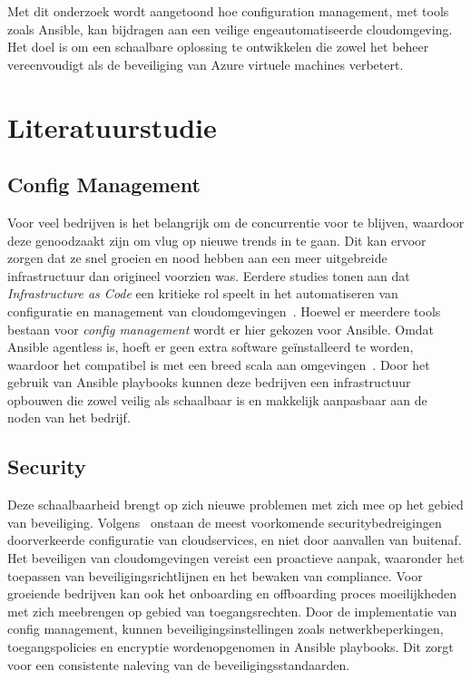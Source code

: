 Met dit onderzoek wordt aangetoond hoe configuration management, met tools zoals Ansible, kan bijdragen aan een veilige en\linebreak geautomatiseerde cloudomgeving.
Het doel is om een schaalbare oplossing te ontwikkelen die zowel het beheer vereenvoudigt als de beveiliging van Azure virtuele machines verbetert.


\section{Literatuurstudie}%
\label{sec:literatuurstudie}

\subsection{Config Management}%

Voor veel bedrijven is het belangrijk om de concurrentie voor te blijven, waardoor deze genoodzaakt zijn om vlug op nieuwe trends in te gaan.
Dit kan ervoor zorgen dat ze snel groeien en nood hebben aan een meer uitgebreide infrastructuur dan origineel voorzien was.
Eerdere studies tonen aan dat \emph{Infrastructure as Code} een kritieke rol speelt in het automatiseren van configuratie en management van cloudomgevingen\linebreak~\autocite{Kalliomaa2024}.
Hoewel er meerdere tools bestaan voor \emph{config management} wordt er hier gekozen voor Ansible.
Omdat Ansible agentless is, hoeft er geen extra software geïnstalleerd te worden, waardoor het compatibel is met een breed scala aan omgevingen~\autocite{Elradi2023}.
Door het gebruik van Ansible playbooks kunnen deze bedrijven een infrastructuur opbouwen die zowel veilig als schaalbaar is en makkelijk aanpasbaar aan de noden van het bedrijf.

\subsection{Security}%

Deze schaalbaarheid brengt op zich nieuwe problemen met zich mee op het gebied van beveiliging.
Volgens~\textcite{Ots2021} onstaan de meest voorkomende securitybedreigingen door\linebreak verkeerde configuratie van cloudservices, en niet door aanvallen van buitenaf.
Het beveiligen van cloudomgevingen vereist een proactieve aanpak, waaronder het toepassen van beveiligingsrichtlijnen en het bewaken van compliance.
Voor groeiende bedrijven kan ook het onboarding en offboarding proces moeilijkheden met zich meebrengen op gebied van toegangsrechten.
Door de implementatie van config management, kunnen beveiligingsinstellingen zoals netwerkbeperkingen, toegangspolicies en encryptie worden\linebreak opgenomen in Ansible playbooks.
Dit zorgt voor een consistente naleving van de beveiligingsstandaarden.

